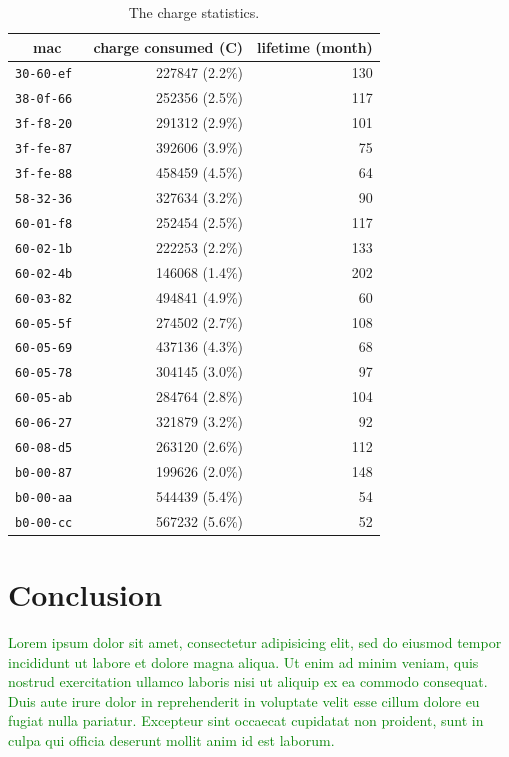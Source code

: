 \documentclass{sig-alternate}
\newcommand{\lorem}               {\textcolor{green}{Lorem ipsum dolor sit amet, consectetur adipisicing elit, sed do eiusmod tempor incididunt ut labore et dolore magna aliqua. Ut enim ad minim veniam, quis nostrud exercitation ullamco laboris nisi ut aliquip ex ea commodo consequat. Duis aute irure dolor in reprehenderit in voluptate velit esse cillum dolore eu fugiat nulla pariatur. Excepteur sint occaecat cupidatat non proident, sunt in culpa qui officia deserunt mollit anim id est laborum.}}
\begin{document}
\begin{table}
  \begin{tabular}{|c|r|r|}
     \hline
     mac            & charge consumed (C) & lifetime (month)\\
     \hline
     \tt{30-60-ef}  & 227847 (2.2\%)  & 130\\
     \tt{38-0f-66}  & 252356 (2.5\%)  & 117\\
     \tt{3f-f8-20}  & 291312 (2.9\%)  & 101\\
     \tt{3f-fe-87}  & 392606 (3.9\%)  & 75 \\
     \tt{3f-fe-88}  & 458459 (4.5\%)  & 64 \\
     \tt{58-32-36}  & 327634 (3.2\%)  & 90 \\
     \tt{60-01-f8}  & 252454 (2.5\%)  & 117\\
     \tt{60-02-1b}  & 222253 (2.2\%)  & 133\\
     \tt{60-02-4b}  & 146068 (1.4\%)  & 202\\
     \tt{60-03-82}  & 494841 (4.9\%)  & 60 \\
     \tt{60-05-5f}  & 274502 (2.7\%)  & 108\\
     \tt{60-05-69}  & 437136 (4.3\%)  & 68 \\
     \tt{60-05-78}  & 304145 (3.0\%)  & 97 \\
     \tt{60-05-ab}  & 284764 (2.8\%)  & 104\\
     \tt{60-06-27}  & 321879 (3.2\%)  & 92 \\
     \tt{60-08-d5}  & 263120 (2.6\%)  & 112\\
     \tt{b0-00-87}  & 199626 (2.0\%)  & 148\\
     \tt{b0-00-aa}  & 544439 (5.4\%)  & 54 \\
     \tt{b0-00-cc}  & 567232 (5.6\%)  & 52 \\
     \hline
  \end{tabular}
  \caption{The charge statistics.}
  \label{tab:stats_charge}
\end{table}

\section{Conclusion}
\label{sec:conclusion}


\lorem




\end{document}

